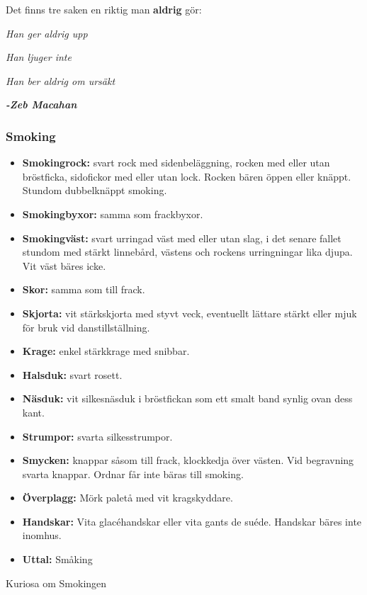 Det finns tre saken en riktig man \textbf{aldrig} gör:

\textit{Han ger aldrig upp}

\textit{Han ljuger inte}

\textit{Han ber aldrig om ursäkt}

\textit{\textbf{-Zeb Macahan}}

\subsubsection*{\textbf{Smoking}}

\begin{itemize}

    \item[]\textbf{Smokingrock:} svart rock med sidenbeläggning, rocken med eller utan bröstficka, sidofickor med eller utan lock. Rocken bären öppen eller knäppt. Stundom dubbelknäppt smoking.

    \item[]\textbf{Smokingbyxor:} samma som frackbyxor.

    \item[]\textbf{Smokingväst:} svart urringad väst med eller utan slag, i det senare fallet stundom med stärkt linnebård, västens och rockens urringningar lika djupa. Vit väst bäres icke.

    \item[]\textbf{Skor:} samma som till frack.

    \item[]\textbf{Skjorta:} vit stärkskjorta med styvt veck, eventuellt lättare stärkt eller mjuk för bruk vid danstillställning.

    \item[]\textbf{Krage:} enkel stärkkrage med snibbar.

    \item[]\textbf{Halsduk:} svart rosett.

    \item[]\textbf{Näsduk:} vit silkesnäsduk i bröstfickan som ett smalt band synlig ovan dess kant.

    \item[]\textbf{Strumpor:} svarta silkesstrumpor.

    \item[]\textbf{Smycken:} knappar såsom till frack, klockkedja över västen. Vid begravning svarta knappar. Ordnar får inte bäras till smoking.

    \item[]\textbf{Överplagg:} Mörk paletå med vit kragskyddare.

    \item[]\textbf{Handskar:} Vita glacéhandskar eller vita gants de suéde. Handskar bäres inte inomhus.
    
    \item[]\textbf{Uttal:} Småking

\end{itemize}
Kuriosa om Smokingen

